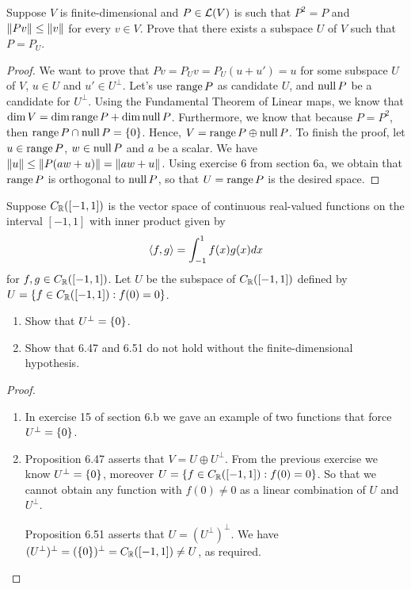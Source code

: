 \begin{exercise}{8}
  Suppose $V$ is finite-dimensional and $P\in\mathcal{L}(V)$ is such that $P^2=P$ and $\left\lVert Pv\right\rVert\leq\left\lVert v\right\rVert$ for every $v\in V$. Prove that there exists a subspace $U$ of $V$ such that $P=P_U$.
\end{exercise}
\begin{proof}
 We want to prove that $Pv =P_Uv =P_U(u+u') =u$ for some subspace $U$ of $V$, $u\in U$ and $u'\in U^\perp$. Let's use $\operatorname*{range} P$ as candidate $U$, and $\operatorname*{null} P$ be a candidate for $U^\perp$. Using the Fundamental Theorem of Linear maps, we know that $\dim V=\dim\operatorname*{range} P +\dim\operatorname*{null} P$. Furthermore, we know that because $P=P^2$, then $\operatorname*{range} P\cap\operatorname*{null} P=\{0\}$. Hence, $V=\operatorname*{range} P\oplus\operatorname*{null} P$. To finish the proof, let $u\in\operatorname*{range} P$, $w\in\operatorname*{null} P$ and $a$ be a scalar. We have $\left\lVert u\right\rVert \leq \left\lVert P(aw+u)\right\rVert=\left\lVert aw+u\right\rVert$. Using exercise 6 from section 6a, we obtain that $\operatorname*{range} P$ is orthogonal to $\operatorname*{null} P$, so that $U=\operatorname*{range} P$ is the desired space.
\end{proof}

\begin{exercise}{14}
  Suppose $C_{\mathbb{R}}([-1,1])$ is the vector space of continuous real-valued functions on the interval $[-1,1]$ with inner product given by
  \begin{align*}
      \langle f,g\rangle = \int_{-1}^1f(x)g(x)dx
  \end{align*}
  for $f,g\in C_{\mathbb{R}}([-1,1])$. Let $U$ be the subspace of $C_{\mathbb{R}}([-1,1])$ defined by $U=\{f\in C_{\mathbb{R}}([-1,1]): f(0)=0\}$.
  \begin{enumerate}
      \item Show that $U^\perp=\{0\}$.
      \item Show that 6.47 and 6.51 do not hold without the finite-dimensional hypothesis.
  \end{enumerate}
\end{exercise}
\begin{proof}
 \begin{enumerate}
     \item In exercise 15 of section 6.b we gave an example of two functions that force $U^\perp=\{0\}$.
     \item Proposition 6.47 asserts that $V=U\oplus U^\perp$. From the previous exercise we know $U^\perp =\{0\}$, moreover $U=\{f\in C_{\mathbb{R}}([-1,1]): f(0)=0\}$. So that we cannot obtain any function with $f(0)\neq 0$ as a linear combination of $U$ and $U^\perp$.

     Proposition 6.51 asserts that $U=(U^\perp)^\perp$. We have $(U^\perp)^\perp =(\{0\})^\perp =C_{\mathbb{R}}([-1,1]) \neq U$, as required. 
 \end{enumerate}
\end{proof}